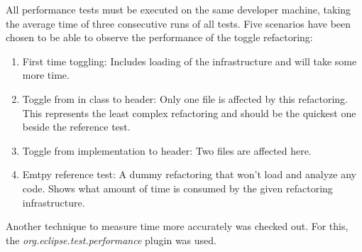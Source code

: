 All performance tests must be executed on the same developer machine, taking the 
average time of three consecutive runs of all tests. Five scenarios have been 
chosen to be able to observe the performance of the toggle refactoring:

\begin{enumerate}
\item First time toggling: Includes loading of the infrastructure and will take 
some more time.
\item Toggle from in class to header: Only one file is affected by this 
refactoring. This represents the least complex refactoring and should be the 
quickest one beside the reference test.
\item Toggle from implementation to header: Two files are affected here.
\item Emtpy reference test: A dummy refactoring that won't load and analyze any 
code. Shows what amount of time is consumed by the given refactoring 
infrastructure.
\end{enumerate}

Another technique to measure time more accurately was checked out. For this, the 
\textit{org.eclipse.test.performance} plugin was used.